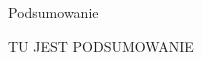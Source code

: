\begin{frame}{Podsumowanie}
    \begin{center}
        {\huge TU JEST PODSUMOWANIE}
    \end{center}
\end{frame}